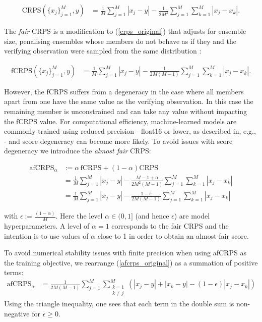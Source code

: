 \documentclass{article}
\begin{document}
\begin{align}
\text{CRPS}(\{x_j\}_{j=1}^{M}, y) &= \frac{1}{M} \sum_{j=1}^{M} |x_j - y| - \frac{1}{2M^2} \sum_{j=1}^{M} \sum_{k=1}^{M} |x_j - x_k|.\tag{1}
\label{crps_original}
\end{align}

The \textit{fair} CRPS is a modification to (\ref{crps_original}) that adjusts for ensemble size, penalising ensembles whose members do not behave as if they and the verifying observation were sampled from the same distribution \citep{Ferro2013,leutbecher2019}:

\begin{align}
\text{fCRPS}(\{x_j\}_{j=1}^{M}, y) &= \frac{1}{M} \sum_{j=1}^{M} |x_j - y| - \frac{1}{2M(M-1)} \sum_{j=1}^{M} \sum_{k=1}^{M} |x_j - x_k|. \tag{2}
\end{align}

However, the fCRPS suffers from a degeneracy in the case where all members apart from one have the same value as the verifying observation. In this case the remaining member is unconstrained and can take any value without impacting the fCRPS value. For computational efficiency, machine-learned models are commonly trained using reduced precision - float16 or lower, as described in, e.g., \cite{micikevicius2018mixedprecisiontraining} - and score degeneracy can become more likely. To avoid issues with score degeneracy we introduce the \textit{almost fair} CRPS:

\begin{align}
\text{afCRPS}_{\alpha} &:= \alpha \, \text{fCRPS} + (1-\alpha) \text{CRPS} \nonumber \\
&= \frac{1}{M} \sum_{j=1}^{M} |x_j - y| - \frac{M - 1 + \alpha}{2M^2(M-1)} \sum_{j=1}^{M} \sum_{k=1}^{M} |x_j - x_k| \nonumber \\
&= \frac{1}{M} \sum_{j=1}^{M} |x_j - y| - \frac{1 - \epsilon}{2M(M-1)} \sum_{j=1}^{M} \sum_{k=1}^{M} |x_j - x_k| \tag{3}
\label{afcrps_original}
\end{align}

with $\epsilon := \frac{(1-\alpha)}{M}$. Here the level $\alpha \in (0, 1]$ (and hence $\epsilon$) are model hyperparameters. A level of $\alpha=1$ corresponds to the fair CRPS and the intention is to use values of $\alpha$ close to 1 in order to obtain an almost fair score. 

To avoid numerical stability issues with finite precision when using afCRPS as the training objective, we rearrange (\ref{afcrps_original}) as a summation of positive terms:
\begin{align}
\text{afCRPS}_{\alpha} &= \frac{1}{2M(M-1)} \sum_{j=1}^{M} \sum_{\substack{k=1 \\ k \neq j}}^{M} \left( |x_j - y| + |x_k - y| - (1-\epsilon) |x_j - x_k| \right) \tag{4}
\end{align}
Using the triangle inequality, one sees that each term in the double sum is non-negative for $\epsilon \geq 0$.
\end{document}
